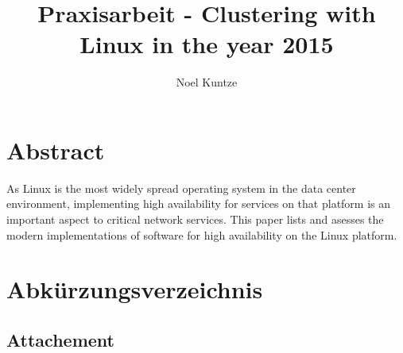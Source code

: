\documentclass[a4paper]{scrartcl}
\newcommand*\BlankPage{\newpage\null\thispagestyle{empty}\newpage}
\begin{document}
\title{Praxisarbeit - Clustering with Linux in the year 2015}
\author{Noel Kuntze }
\maketitle

\BlankPage

{}

\section*{Abstract}
As Linux is the most widely spread operating system in the data center environment,
implementing high availability for services on that platform is an important aspect to
critical network services. This paper lists and asesses the modern implementations
of software for high availability on the Linux platform.

\cleardoublepage
{}

\listoffigures

\cleardoublepage
\section*{Abkürzungsverzeichnis}
\begin{acronym}
    \acro{}{}
\end{acronym}

\newpage

\tableofcontents
\setcounter{tocdepth}{2}

\newpage
{}
















\newpage


\nocite{*}
{}



\newpage
\begin{appendix}

\section{Attachement}
\end{appendix}
\end{document}
